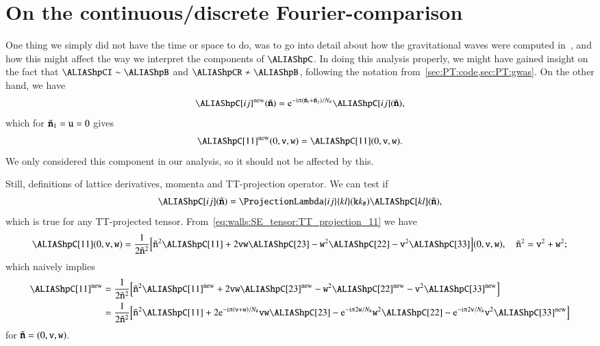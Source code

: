 \section{On the continuous/discrete Fourier-comparison}
    One thing we simply did not have the time or space to do, was to go into detail about how the gravitational waves were computed in~\asgrd, and how this might affect the way we interpret the components of $\hpC$. 
    In doing this analysis properly, we might have gained insight on the fact that $\hpCI \sim \hpB$ and $\hpCR \not\sim \hpB$, following the notation from~\cref{sec:PT:code,sec:PT:gwas}. On the other hand, we have~\citep{adamekGevolutionCosmologicalNbody2016}
    \begin{equation}
        \hpC[ij]\ap{new}(\lcoordk) = \eu[-\im \ppi (\lcoordk_i + \lcoordk_j)/N_\# ] \hpC[ij](\lcoordk),
    \end{equation}
    which for $\tilde{\boldsymbol{\mathtt{n}}}_1 =\mathtt{u}= 0$ gives 
    \begin{equation}
        \hpC[11]\ap{new}(0,\lcoord{v},\lcoord{w}) = \hpC[11](0,\lcoord{v},\lcoord{w}).
    \end{equation}
    We only considered this component in our analysis, so it should not be affected by this.

    Still, definitions of lattice derivatives, momenta and TT-projection operator. We can test if
    \begin{equation}
        \hpC[ij](\lcoordk) =  \ProjectionLambda{ij}{kl}(\lcoord{k}k_\#) \hpC[kl](\lcoordk),
    \end{equation}
    which is true for any TT-projected tensor. From~\cref{eq:walls:SE_tensor:TT_projection_11} we have
    \begin{equation}
        \hpC[11](0,\lcoord{v},\lcoord{w}) = \frac{1}{2\tilde{\lcoord{n}}^2}  \bclosed{\tilde{\lcoord{n}}^2 \hpC[11] + 2 \lcoord{v}\lcoord{w}\hpC[23] - \lcoord{w}^2 \hpC[22] - \lcoord{v}^2 \hpC[33]  }(0,\lcoord{v},\lcoord{w}) , \quad \tilde{\lcoord{n}}^2 = \lcoord{v}^2 + \lcoord{w}^2;
    \end{equation}
    which naively implies
    \begin{align}
        \hpC[11]\ap{new}&= \frac{1}{2\tilde{\lcoord{n}}^2}  \bclosed{\tilde{\lcoord{n}}^2 \hpC[11]\ap{new} + 2 \lcoord{v}\lcoord{w}\hpC[23]\ap{new} - \lcoord{w}^2 \hpC[22]\ap{new} - \lcoord{v}^2 \hpC[33]\ap{new}  }\nonumber \\
        & = \frac{1}{2\tilde{\lcoord{n}}^2} \bclosed{\tilde{\lcoord{n}}^2 \hpC[11]+ 2 \eu[-\im \ppi (\lcoord{v}+\lcoord{w})/N_\#] \lcoord{v}\lcoord{w}\hpC[23] - \eu[-\im \ppi 2\lcoord{w}/N_\#] \lcoord{w}^2 \hpC[22] - \eu[-\im \ppi 2\lcoord{v}/N_\#]\lcoord{v}^2 \hpC[33]\ap{new}  }
    \end{align}
    for $\tilde{\boldsymbol{\mathtt{n}}} = (0,\mathtt{v},\mathtt{w})$. 
    
